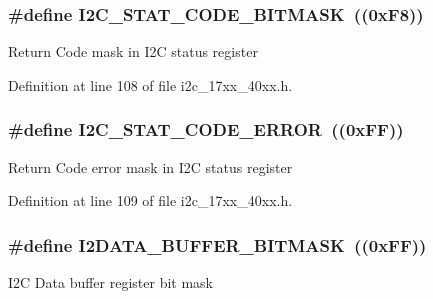\subsubsection[{\texorpdfstring{I2\+C\+\_\+\+S\+T\+A\+T\+\_\+\+C\+O\+D\+E\+\_\+\+B\+I\+T\+M\+A\+SK}{I2C_STAT_CODE_BITMASK}}]{\setlength{\rightskip}{0pt plus 5cm}\#define I2\+C\+\_\+\+S\+T\+A\+T\+\_\+\+C\+O\+D\+E\+\_\+\+B\+I\+T\+M\+A\+SK~((0x\+F8))}\hypertarget{group__I2C__17XX__40XX_gafeb8b5f682a81a2cc32f6c4b720a5e1f}{}\label{group__I2C__17XX__40XX_gafeb8b5f682a81a2cc32f6c4b720a5e1f}
Return Code mask in I2C status register 

Definition at line 108 of file i2c\+\_\+17xx\+\_\+40xx.\+h.

\subsubsection[{\texorpdfstring{I2\+C\+\_\+\+S\+T\+A\+T\+\_\+\+C\+O\+D\+E\+\_\+\+E\+R\+R\+OR}{I2C_STAT_CODE_ERROR}}]{\setlength{\rightskip}{0pt plus 5cm}\#define I2\+C\+\_\+\+S\+T\+A\+T\+\_\+\+C\+O\+D\+E\+\_\+\+E\+R\+R\+OR~((0x\+F\+F))}\hypertarget{group__I2C__17XX__40XX_gacfbf48ab1ed4f43314f63898ac827925}{}\label{group__I2C__17XX__40XX_gacfbf48ab1ed4f43314f63898ac827925}
Return Code error mask in I2C status register 

Definition at line 109 of file i2c\+\_\+17xx\+\_\+40xx.\+h.

\subsubsection[{\texorpdfstring{I2\+D\+A\+T\+A\+\_\+\+B\+U\+F\+F\+E\+R\+\_\+\+B\+I\+T\+M\+A\+SK}{I2DATA_BUFFER_BITMASK}}]{\setlength{\rightskip}{0pt plus 5cm}\#define I2\+D\+A\+T\+A\+\_\+\+B\+U\+F\+F\+E\+R\+\_\+\+B\+I\+T\+M\+A\+SK~((0x\+F\+F))}\hypertarget{group__I2C__17XX__40XX_ga95d605cbb817fa36d9c83545dd23fb5f}{}\label{group__I2C__17XX__40XX_ga95d605cbb817fa36d9c83545dd23fb5f}
I2C Data buffer register bit mask 

